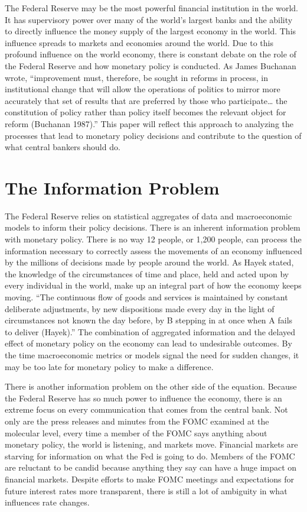 \documentclass[11pt,]{article}
\begin{document}
The Federal Reserve may be the most powerful financial institution in
the world. It has supervisory power over many of the world's largest
banks and the ability to directly influence the money supply of the
largest economy in the world. This influence spreads to markets and
economies around the world. Due to this profound influence on the world
economy, there is constant debate on the role of the Federal Reserve and
how monetary policy is conducted. As James Buchanan wrote, ``improvement
must, therefore, be sought in reforms in process, in institutional
change that will allow the operations of politics to mirror more
accurately that set of results that are preferred by those who
participate\ldots{} the constitution of policy rather than policy itself
becomes the relevant object for reform (Buchanan 1987).'' This paper
will reflect this approach to analyzing the processes that lead to
monetary policy decisions and contribute to the question of what central
bankers should do.

\section{The Information Problem}\label{the-information-problem}

The Federal Reserve relies on statistical aggregates of data and
macroeconomic models to inform their policy decisions. There is an
inherent information problem with monetary policy. There is no way 12
people, or 1,200 people, can process the information necessary to
correctly assess the movements of an economy influenced by the millions
of decisions made by people around the world. As Hayek stated, the
knowledge of the circumstances of time and place, held and acted upon by
every individual in the world, make up an integral part of how the
economy keeps moving. ``The continuous flow of goods and services is
maintained by constant deliberate adjustments, by new dispositions made
every day in the light of circumstances not known the day before, by B
stepping in at once when A fails to deliver (Hayek).'' The combination
of aggregated information and the delayed effect of monetary policy on
the economy can lead to undesirable outcomes. By the time macroeconomic
metrics or models signal the need for sudden changes, it may be too late
for monetary policy to make a difference.

There is another information problem on the other side of the equation.
Because the Federal Reserve has so much power to influence the economy,
there is an extreme focus on every communication that comes from the
central bank. Not only are the press releases and minutes from the FOMC
examined at the molecular level, every time a member of the FOMC says
anything about monetary policy, the world is listening, and markets
move. Financial markets are starving for information on what the Fed is
going to do. Members of the FOMC are reluctant to be candid because
anything they say can have a huge impact on financial markets. Despite
efforts to make FOMC meetings and expectations for future interest rates
more transparent, there is still a lot of ambiguity in what influences
rate changes.
\end{document}
